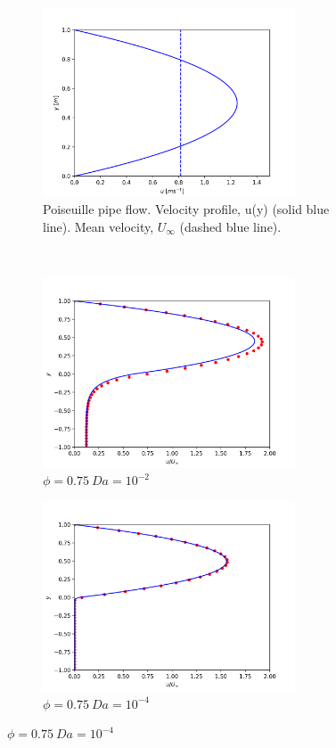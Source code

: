 \documentclass[a4paper,11pt]{report}
\begin{document}
\begin{figure}[ht]
    \centering
    \begin{subfigure}[b]{75mm}
        \includegraphics[width=75mm]{"channelFlow.png"}
        \caption{Poiseuille pipe flow. Velocity profile, u(y) (solid blue line). Mean velocity, $U_{\infty}$ (dashed blue line).}
        \label{fig:poiseuille_pipe_flow}
    \end{subfigure}
    \\
    \begin{subfigure}[b]{75mm}
        \includegraphics[width=75mm]{"pty0-75_Da1e-2.png"}
        \caption{$\phi=0.75\ Da=10^{-2}$}
        \label{fig:pty075_Da1e-2}
    \end{subfigure}
    \begin{subfigure}[b]{75mm}
        \includegraphics[width=75mm]{"pty0-75_Da1e-4.png"}
        \caption{$\phi=0.75\ Da=10^{-4}$}
        \label{fig:pty0-75_Da1e-4}

\end{subfigure}
\end{figure}
\end{document}
